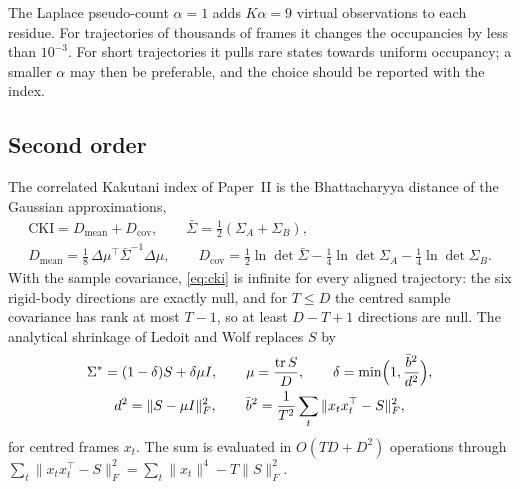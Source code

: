 \documentclass[11pt,reqno]{amsart}
\theoremstyle{plain}
\theoremstyle{definition}
\theoremstyle{remark}
\numberwithin{equation}{section}
\begin{document}
The Laplace pseudo-count $\alpha=1$ adds $K\alpha=9$ virtual observations to each residue. For trajectories of thousands of frames it changes the occupancies by less than $10^{-3}$. For short trajectories it pulls rare states towards uniform occupancy; a smaller $\alpha$ may then be preferable, and the choice should be reported with the index.

\subsection*{Second order}
The correlated Kakutani index of Paper~II \cite{ChenChen2026II} is the Bhattacharyya distance of the Gaussian approximations,
\begin{equation}\label{eq:cki}
\begin{gathered}
\mathrm{CKI}=D_{\mathrm{mean}}+D_{\mathrm{cov}},\qquad \bar\Sigma=\tfrac12(\Sigma_A+\Sigma_B),\\
D_{\mathrm{mean}}=\tfrac18\,\Delta\mu^{\top}\bar\Sigma^{-1}\Delta\mu,\qquad D_{\mathrm{cov}}=\tfrac12\ln\det\bar\Sigma-\tfrac14\ln\det\Sigma_A-\tfrac14\ln\det\Sigma_B .
\end{gathered}
\end{equation}
With the sample covariance, \eqref{eq:cki} is infinite for every aligned trajectory: the six rigid-body directions are exactly null, and for $T\le D$ the centred sample covariance has rank at most $T-1$, so at least $D-T+1$ directions are null. The analytical shrinkage of Ledoit and Wolf \cite{LedoitWolf2004} replaces $S$ by
\begin{equation}\label{eq:lw}
\begin{gathered}
\Sigma^*=(1-\delta)S+\delta\mu I,\qquad \mu=\frac{\operatorname{tr}S}D,\qquad \delta=\min\Bigl(1,\frac{\bar b^2}{d^2}\Bigr),\\
d^2=\|S-\mu I\|_F^2,\qquad \bar b^2=\frac1{T^2}\sum_{t}\|x_tx_t^{\top}-S\|_F^2,
\end{gathered}
\end{equation}
for centred frames $x_t$. The sum is evaluated in $O(TD+D^2)$ operations through $\sum_t\|x_tx_t^{\top}-S\|_F^2=\sum_t\|x_t\|^4-T\|S\|_F^2$.
\end{document}
